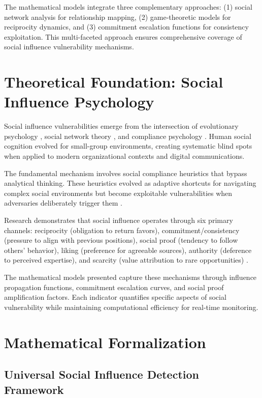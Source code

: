 \documentclass[11pt,a4paper]{article}
\begin{document}
The mathematical models integrate three complementary approaches: (1) social network analysis for relationship mapping, (2) game-theoretic models for reciprocity dynamics, and (3) commitment escalation functions for consistency exploitation. This multi-faceted approach ensures comprehensive coverage of social influence vulnerability mechanisms.

\section{Theoretical Foundation: Social Influence Psychology}

Social influence vulnerabilities emerge from the intersection of evolutionary psychology \cite{buss1999}, social network theory \cite{watts1998}, and compliance psychology \cite{kelman1958}. Human social cognition evolved for small-group environments, creating systematic blind spots when applied to modern organizational contexts and digital communications.

The fundamental mechanism involves social compliance heuristics that bypass analytical thinking. These heuristics evolved as adaptive shortcuts for navigating complex social environments but become exploitable vulnerabilities when adversaries deliberately trigger them \cite{cialdini2007}.

Research demonstrates that social influence operates through six primary channels: reciprocity (obligation to return favors), commitment/consistency (pressure to align with previous positions), social proof (tendency to follow others' behavior), liking (preference for agreeable sources), authority (deference to perceived expertise), and scarcity (value attribution to rare opportunities) \cite{cialdini2007}.

The mathematical models presented capture these mechanisms through influence propagation functions, commitment escalation curves, and social proof amplification factors. Each indicator quantifies specific aspects of social vulnerability while maintaining computational efficiency for real-time monitoring.

\section{Mathematical Formalization}

\subsection{Universal Social Influence Detection Framework}
\end{document}
